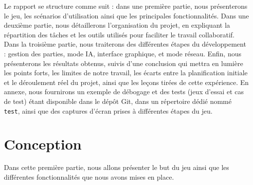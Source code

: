 \documentclass[12pt, a4paper, oneside]{article}
\begin{document}
    Le rapport se structure comme suit : dans une première partie, nous 
    présenterons le jeu, les scénarios d’utilisation ainsi que les principales 
    fonctionnalités. Dans une deuxième partie, nous détaillerons l’organisation 
    du projet, en expliquant la répartition des tâches et les outils utilisés 
    pour faciliter le travail collaboratif. Dans la troisième partie, nous 
    traiterons des différentes étapes du développement : gestion des parties, 
    mode IA, interface graphique, et mode réseau. Enfin, nous présenterons les 
    résultats obtenus, suivis d’une conclusion qui mettra en lumière les points 
    forts, les limites de notre travail, les écarts entre la planification 
    initiale et le déroulement réel du projet, ainsi que les leçons tirées de 
    cette expérience. En annexe, nous fournirons un exemple de débogage et des 
    tests (jeux d’essai et cas de test) étant disponible dans le dépôt Git, dans 
    un répertoire dédié nommé \texttt{test}, ainsi que des captures d’écran 
    prises à différentes étapes du jeu.

\section{Conception}
    Dans cette première partie, nous allons présenter le but du jeu ainsi que les différentes fonctionnalités que nous avons 
    mises en place. 
\end{document}
